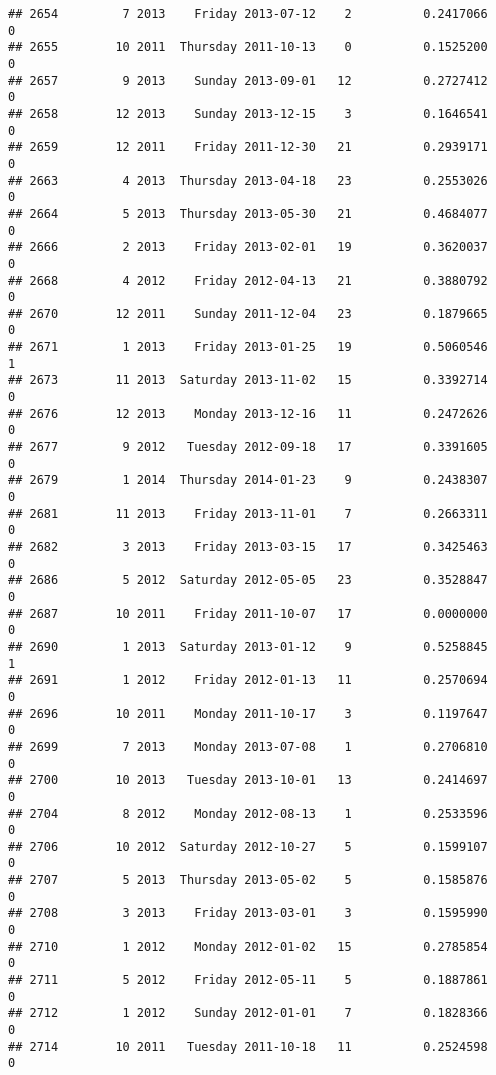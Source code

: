 \documentclass[
]{article}
\begin{document}
\begin{verbatim}
## 2654         7 2013    Friday 2013-07-12    2          0.2417066             0
## 2655        10 2011  Thursday 2011-10-13    0          0.1525200             0
## 2657         9 2013    Sunday 2013-09-01   12          0.2727412             0
## 2658        12 2013    Sunday 2013-12-15    3          0.1646541             0
## 2659        12 2011    Friday 2011-12-30   21          0.2939171             0
## 2663         4 2013  Thursday 2013-04-18   23          0.2553026             0
## 2664         5 2013  Thursday 2013-05-30   21          0.4684077             0
## 2666         2 2013    Friday 2013-02-01   19          0.3620037             0
## 2668         4 2012    Friday 2012-04-13   21          0.3880792             0
## 2670        12 2011    Sunday 2011-12-04   23          0.1879665             0
## 2671         1 2013    Friday 2013-01-25   19          0.5060546             1
## 2673        11 2013  Saturday 2013-11-02   15          0.3392714             0
## 2676        12 2013    Monday 2013-12-16   11          0.2472626             0
## 2677         9 2012   Tuesday 2012-09-18   17          0.3391605             0
## 2679         1 2014  Thursday 2014-01-23    9          0.2438307             0
## 2681        11 2013    Friday 2013-11-01    7          0.2663311             0
## 2682         3 2013    Friday 2013-03-15   17          0.3425463             0
## 2686         5 2012  Saturday 2012-05-05   23          0.3528847             0
## 2687        10 2011    Friday 2011-10-07   17          0.0000000             0
## 2690         1 2013  Saturday 2013-01-12    9          0.5258845             1
## 2691         1 2012    Friday 2012-01-13   11          0.2570694             0
## 2696        10 2011    Monday 2011-10-17    3          0.1197647             0
## 2699         7 2013    Monday 2013-07-08    1          0.2706810             0
## 2700        10 2013   Tuesday 2013-10-01   13          0.2414697             0
## 2704         8 2012    Monday 2012-08-13    1          0.2533596             0
## 2706        10 2012  Saturday 2012-10-27    5          0.1599107             0
## 2707         5 2013  Thursday 2013-05-02    5          0.1585876             0
## 2708         3 2013    Friday 2013-03-01    3          0.1595990             0
## 2710         1 2012    Monday 2012-01-02   15          0.2785854             0
## 2711         5 2012    Friday 2012-05-11    5          0.1887861             0
## 2712         1 2012    Sunday 2012-01-01    7          0.1828366             0
## 2714        10 2011   Tuesday 2011-10-18   11          0.2524598             0

\end{verbatim}
\end{document}
